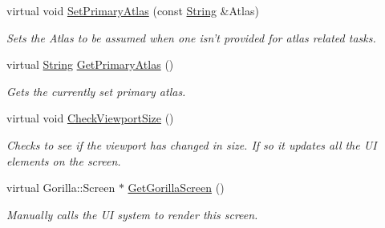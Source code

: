 \begin{DoxyCompactItemize}
virtual void \hyperlink{classphys_1_1UI_1_1Screen_a0797ae5a260b88b253412276db961394}{SetPrimaryAtlas} (const \hyperlink{namespacephys_aa03900411993de7fbfec4789bc1d392e}{String} \&Atlas)
\begin{DoxyCompactList}\small\item\em Sets the Atlas to be assumed when one isn't provided for atlas related tasks. \item\end{DoxyCompactList}\item 
virtual \hyperlink{namespacephys_aa03900411993de7fbfec4789bc1d392e}{String} \hyperlink{classphys_1_1UI_1_1Screen_a2e1c1929e23577e95d6226a58b7602da}{GetPrimaryAtlas} ()
\begin{DoxyCompactList}\small\item\em Gets the currently set primary atlas. \item\end{DoxyCompactList}\item 
\hypertarget{classphys_1_1UI_1_1Screen_a401ab41eafc9417ef57c66ff32c8038c}{
virtual void \hyperlink{classphys_1_1UI_1_1Screen_a401ab41eafc9417ef57c66ff32c8038c}{CheckViewportSize} ()}
\label{d8/df0/classphys_1_1UI_1_1Screen_a401ab41eafc9417ef57c66ff32c8038c}

\begin{DoxyCompactList}\small\item\em Checks to see if the viewport has changed in size. If so it updates all the UI elements on the screen. \item\end{DoxyCompactList}\item 
virtual Gorilla::Screen $\ast$ \hyperlink{classphys_1_1UI_1_1Screen_a6ba3a966f2977cc095355c93d5bec81d}{GetGorillaScreen} ()
\begin{DoxyCompactList}\small\item\em Manually calls the UI system to render this screen. \item\end{DoxyCompactList}\end{DoxyCompactItemize}
